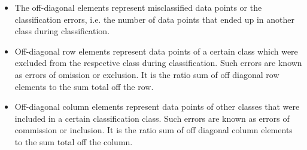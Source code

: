 \documentclass[11pt,paper=a4,answers]{exam}
\begin{document}
\begin{questions}
\begin{enumerate}[i.]
\begin{enumerate}
\begin{itemize}
                        \item The off-diagonal elements represent misclassified data points or the classification errors, i.e. the number of data points that ended up in another class during classification. 
                        \item Off-diagonal row elements represent data points of a certain class which were excluded from the respective class during classification. Such errors are known as errors of omission or exclusion. It is the ratio sum of off diagonal row elements to the sum total off the row.
                        \item Off-diagonal column elements represent data points of other classes that were included in a certain classification class. Such errors are known as errors of commission or inclusion. It is the ratio sum of off diagonal column elements to the sum total off the column.
                    \end{itemize}
                    

\end{enumerate}
\end{enumerate}
\end{questions}
\end{document}
